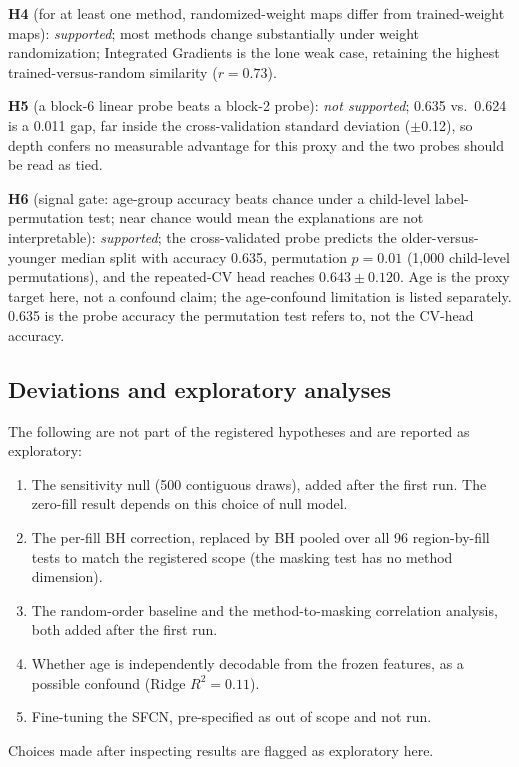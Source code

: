 \documentclass[11pt]{article}
\begin{document}
\textbf{H4} (for at least one method, randomized-weight maps differ from trained-weight maps): \emph{supported}; most methods change substantially under weight randomization; Integrated Gradients is the lone weak case, retaining the highest trained-versus-random similarity ($r=0.73$).

\textbf{H5} (a block-6 linear probe beats a block-2 probe): \emph{not supported}; 0.635 vs.\ 0.624 is a 0.011 gap, far inside the cross-validation standard deviation ($\pm$0.12), so depth confers no measurable advantage for this proxy and the two probes should be read as tied.

\textbf{H6} (signal gate: age-group accuracy beats chance under a child-level label-permutation test; near chance would mean the explanations are not interpretable): \emph{supported}; the cross-validated probe predicts the older-versus-younger median split with accuracy 0.635, permutation $p=0.01$ (1{,}000 child-level permutations), and the repeated-CV head reaches $0.643\pm0.120$. Age is the proxy target here, not a confound claim; the age-confound limitation is listed separately. 0.635 is the probe accuracy the permutation test refers to, not the CV-head accuracy.

\subsection{Deviations and exploratory analyses}
\label{sec:deviations}
The following are not part of the registered hypotheses and are reported as exploratory:
\begin{enumerate}[leftmargin=1.6em]
\item The sensitivity null (500 contiguous draws), added after the first run. The zero-fill result depends on this choice of null model.
\item The per-fill BH correction, replaced by BH pooled over all 96 region-by-fill tests to match the registered scope (the masking test has no method dimension).
\item The random-order baseline and the method-to-masking correlation analysis, both added after the first run.
\item Whether age is independently decodable from the frozen features, as a possible confound (Ridge $R^2=0.11$).
\item Fine-tuning the SFCN, pre-specified as out of scope and not run.
\end{enumerate}
Choices made after inspecting results are flagged as exploratory here.
\end{document}
